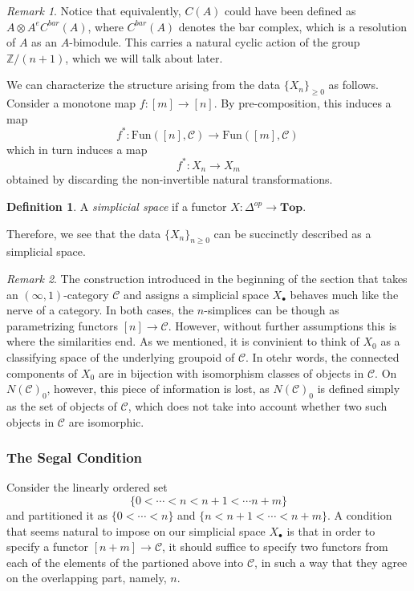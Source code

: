 \documentclass[a4paper,11pt]{article}
\newcommand{\ccal}{\mathcal{C}}
\newcommand{\topo}{\mathbf{Top}}
\theoremstyle{plain}
\theoremstyle{definition}
\newtheorem{defi}[thm]{Definition}
\theoremstyle{remark}
\newtheorem*{rem}{Remark}
\begin{document}
\begin{rem}
Notice that equivalently, $C(A)$ could have been defined as $A \otimes{A^e} C^{bar}(A)$, where $C^{bar}(A)$ denotes the bar complex, which is a resolution of $A$ as an $A$-bimodule. This carries a natural cyclic action of the group $\mathbb{Z}/(n+1)$, which we will talk about later. 
\end{rem}


We can characterize the structure arising from the data $\{X_n\}_{\geq 0}$ as follows. Consider a monotone map $f \colon [m] \to [n]$. By pre-composition, this induces a map 
$$f^* \colon \text{Fun}([n], \ccal) \to \text{Fun}([m], \ccal) \, $$
which in turn induces a map 
$$f^* \colon X_n \to X_m$$
obtained by discarding the non-invertible natural transformations. 

\begin{defi}
A \textit{simplicial space} if a functor $X \colon \Delta^{op} \to \topo$.
\end{defi}

Therefore, we see that the data $\{X_n\}_{n \geq 0}$ can be succinctly described as a simplicial space.  

\begin{rem}
\label{not_inverse}
The construction introduced in the beginning of the section that takes an $(\infty, 1)$-category $\ccal$ and assigns a simplicial space $X_{\bullet}$ behaves much like the nerve of a category. In both cases, the $n$-simplices can be though as parametrizing functors $[n] \to \ccal$. However, without further assumptions this is where the similarities end. As we mentioned, it is convinient to think of $X_0$ as a classifying space of the underlying groupoid of $\ccal$. In otehr words, the connected components of $X_0$ are in bijection with isomorphism classes of objects in $\ccal$. On $N(\ccal)_0$, however, this piece of information is lost, as $N(\ccal)_0$ is defined simply as the set of objects of $\ccal$, which does not take into account whether two such objects in $\ccal$ are isomorphic. 
\end{rem}


\subsubsection{The Segal Condition}
Consider the linearly ordered set 
$$\{0 < \cdots < n <n+1 < \cdots n+m\}$$
and partitioned it as $\{0 < \cdots <n\}$ and $\{n < n+1 < \cdots < n+m\}$. A condition that seems natural to impose on our simplicial space $X_{\bullet}$ is that in order to specify a functor $[n+m] \to \ccal$, it should suffice to specify two functors from each of the elements of the partioned above into $\ccal$, in such a way that they agree on the overlapping part, namely, $n$. 
\end{document}
